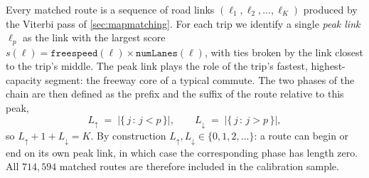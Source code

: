 \documentclass[sigconf, review]{acmart}
\begin{document}
Every matched route is a sequence of road links
$(\ell_1, \ell_2, \ldots, \ell_K)$ produced by the Viterbi pass of
\cref{sec:mapmatching}. For each trip we identify a single \emph{peak link}
$\ell_{p}$ as the link with the largest score $s(\ell) =
\texttt{freespeed}(\ell) \times \texttt{numLanes}(\ell)$, with ties
broken by the link closest to the trip's middle. The peak link
plays the role of the trip's fastest, highest-capacity segment: the
freeway core of a typical commute. The two phases of the chain are
then defined as the prefix and the suffix of the route relative to
this peak,
\begin{equation}
\label{eq:phase-split}
L_{\uparrow} \;=\; \big|\{\,j \,:\, j < p\,\}\big|,
\qquad
L_{\downarrow} \;=\; \big|\{\,j \,:\, j > p\,\}\big|,
\end{equation}
so 
$L_{\uparrow} + 1 + L_{\downarrow} = K$. 
By construction
$L_{\uparrow}, L_{\downarrow} \in \{0, 1, 2, \ldots\}$: a route
can begin or end on its own peak link, in which case the
corresponding phase has length zero. 
All $714{,}594$ matched routes are therefore included in the
calibration sample.
\end{document}
